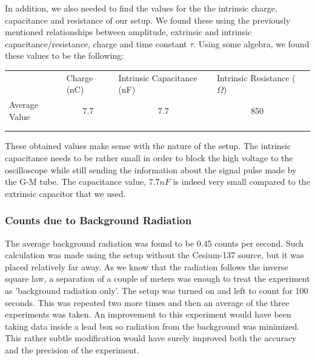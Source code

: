 \documentclass[a4paper]{article}
\begin{document}
In addition, we also needed to find the values for the the intrinsic charge, capacitance and resistance of our setup. We found these using the previously mentioned  relationships between amplitude, extrinsic and intrinsic capacitance/resistance, charge and time constant $\tau$. Using some algebra, we found these values to be the following:

\begin{table}[h]
\centering
\label{my-label}
\begin{tabular}{lllll}
\cline{1-4}
\rowcolor[HTML]{C0C0C0} 
\multicolumn{1}{|l|}{\cellcolor[HTML]{C0C0C0}}              & \multicolumn{1}{l|}{\cellcolor[HTML]{C0C0C0}Charge (nC)} & \multicolumn{1}{l|}{\cellcolor[HTML]{C0C0C0}Intrinsic Capacitance (nF)} & \multicolumn{1}{l|}{\cellcolor[HTML]{C0C0C0}Intrinsic Resistance ($\Omega$)} &  \\ \cline{1-4}
\multicolumn{1}{|l|}{\cellcolor[HTML]{EFEFEF}Average Value} & \multicolumn{1}{c|}{7.7}                                 & \multicolumn{1}{c|}{7.7}                                                & \multicolumn{1}{c|}{850}                                                     &  \\ \cline{1-4}
                                                            &                                                          &                                                                         &                                                                              &  \\
                                                            &                                                          &                                                                         &                                                                              & 
\end{tabular}
\end{table}

These obtained values make sense with the nature of the setup. The intrinsic capacitance needs to be rather small in order to block the high voltage to the oscilloscope while still sending the information about the signal pulse made by the G-M tube. The capacitance value, $7.7nF$ is indeed very small compared to the extrinsic capacitor that we used. 

\subsubsection{Counts due to Background Radiation}
The average background radiation was found to be 0.45 counts per second. Such calculation was made using the setup without the Cesium-137 source, but it was placed relatively far away. As we know that the radiation follows the inverse square law, a separation of a couple of meters was enough to treat the experiment as 'background radiation only'. The setup was turned on and left to count for 100 seconds. This was repeated two more times and then an average of the three experiments was taken. An improvement to this experiment would have been taking data inside a lead box so radiation from the background was minimized. This rather subtle modification would have surely improved both the accuracy and the precision of the experiment.
\end{document}
